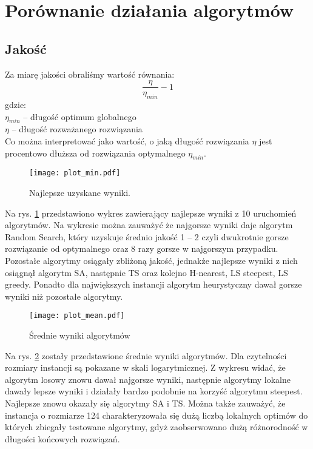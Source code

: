\documentclass{article}
\begin{document}
\section{Porównanie działania algorytmów}


\subsection{Jakość}
Za miarę jakości obraliśmy wartość równania:
$$ \frac{\eta}{\eta_{min}}-1 $$
gdzie:\\
$\eta_{min}$ -- długość optimum globalnego \\
$\eta$ -- długość rozważanego rozwiązania \\
Co można interpretować jako wartość, o jaką długość rozwiązania $\eta$ jest procentowo dłuższa od rozwiązania optymalnego $\eta_{min}$.

\begin{figure}[H]
\begin{center}
    \texttt{[image: plot\_min.pdf]}
\end{center}
\caption{Najlepsze uzyskane wyniki.}
\label{fig:plot_min}
\end{figure}

Na rys. \ref{fig:plot_min} przedstawiono wykres zawierający najlepsze wyniki z 10 uruchomień algorytmów. Na wykresie można zauważyć że najgorsze wyniki daje algorytm Random Search, który uzyskuje średnio jakość 1 -- 2 czyli dwukrotnie gorsze rozwiązanie od optymalnego oraz 8 razy gorsze w najgorszym przypadku. Pozostałe algorytmy osiągały zbliżoną jakość, jednakże najlepsze wyniki z nich osiągnął algorytm SA, następnie TS oraz kolejno H-nearest, LS steepest, LS greedy. Ponadto dla największych instancji algorytm heurystyczny dawał gorsze wyniki niż pozostałe algorytmy.

\begin{figure}[H]
\begin{center}
    \texttt{[image: plot\_mean.pdf]}
\end{center}
\caption{Średnie wyniki algorytmów}
\label{fig:plot_avg}
\end{figure}


Na rys. \ref{fig:plot_avg} zostały przedstawione średnie wyniki algorytmów. Dla czytelności rozmiary instancji są pokazane w skali logarytmicznej. Z wykresu widać, że algorytm losowy znowu dawał najgorsze wyniki, następnie algorytmy lokalne dawały lepsze wyniki i działały bardzo podobnie na korzyść algorytmu steepest. Najlepsze znowu okazały się algorytmy SA i TS. Można także zauważyć, że instancja o rozmiarze 124 charakteryzowała się dużą liczbą lokalnych optimów do których zbiegały testowane algorytmy, gdyż zaobserwowano dużą różnorodność w długości końcowych rozwiązań.
\end{document}
